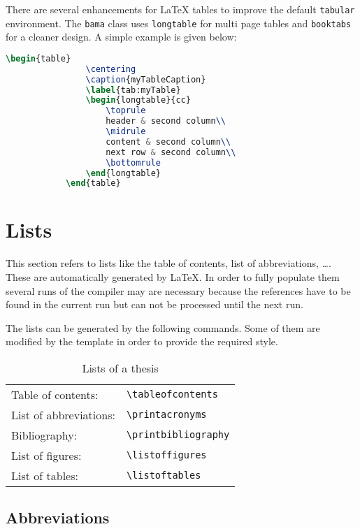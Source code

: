 		There are several enhancements for {\LaTeX} tables to improve the default \texttt{tabular} environment. The \texttt{bama} class uses \texttt{longtable} for multi page tables and \texttt{booktabs} for a cleaner design. A simple example is given below:
		
		\begin{lstlisting}[language=TeX]
			\begin{table}
				\centering
				\caption{myTableCaption}
				\label{tab:myTable}
				\begin{longtable}{cc}
					\toprule
					header & second column\\
					\midrule
					content & second column\\
					next row & second column\\
					\bottomrule
				\end{longtable}
			\end{table}
		\end{lstlisting}
	
\section{Lists}

This section refers to lists like the table of contents, list of abbreviations, \dots. These are automatically generated by {\LaTeX}. In order to fully populate them several runs of the compiler may are necessary because the references have to be found in the current run but can not be processed until the next run.

The lists can be generated by the following commands. Some of them are modified by the template in order to provide the required style.

\begin{table}
	\centering
	\caption{Lists of a thesis}
	\label{tab:listofs}
	\begin{tabular}{ll}
		\toprule
		Table of contents:    & {\verb|\tableofcontents|} \\
		List of abbreviations: & {\verb|\printacronyms|} \\
		Bibliography:  & {\verb|\printbibliography|} \\
		List of figures: & {\verb|\listoffigures|} \\
		List of tables:   & {\verb|\listoftables|}\\
		\bottomrule
	\end{tabular}
\end{table}

	\subsection{Abbreviations}
	\label{sec:acronyms}


